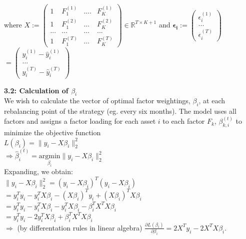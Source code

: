 \documentclass{article}
\begin{document}
where $X := \begin{pmatrix} 1 & F_1^{(1)} & .... & F_K^{(1)} \\
1 & F_1^{(2)} & ... & F_K^{(2)}\\
... & ... & ... & ...\\
1 & F_1^{(T)} & ... & F_K^{(T)} \end{pmatrix} \in \mathbb{R}^{T \times K + 1}$ and $\bm{\epsilon_i} := \begin{pmatrix}
\epsilon_i^{(1)}\\
...\\
\epsilon_i^{(T)} \end{pmatrix}$ $= \begin{pmatrix} y_i^{(1)} - \hat{y}_i^{(1)}\\
...\\
y_i^{(T)} - \hat{y}_i^{(T)} \end{pmatrix}$\\

\vspace{5mm}

\textbf{3.2: Calculation of $\beta_i$}\\  

We wish to calculate the vector of optimal factor weightings, $\beta_i$, at each rebalancing point of the strategy (eg. every six months). The model uses all factors and assigns a factor loading for each asset $i$ to each factor $F_k$, $\beta_{k,i}^{(t)}$ to minimize the objective function\\

$L(\beta_i) = \|y_i - X\beta_i\|_2^2$\\

$\Rightarrow \hat{\beta}_i^{(t)} = \underset{\beta_i}{\text{argmin}} \|y_i - X\beta_i\|_2^2$\\

Expanding, we obtain:\\

$\|y_i - X\beta_i\|_2^2 = (y_i - X\beta_i)^T(y_i - X\beta_i)$\\

$= y_i^Ty_i - y_i^TX\beta_i - (X\beta_i)^Ty_i + (X\beta_i)^TX\beta_i$\\

$= y_i^Ty_i -y_i^TX\beta_i - y_i^TX\beta_i - \beta_i^TX^TX\beta_i$\\

$= y_i^Ty_i - 2y_i^TX\beta_i + \beta_i^TX^TX\beta_i$\\

$\Rightarrow$ (by differentation rules in linear algebra) $\frac{\partial L(\beta_i)}{\partial \beta_i} = 2X^Ty_i - 2X^TX\beta_i$.\\
\end{document}
